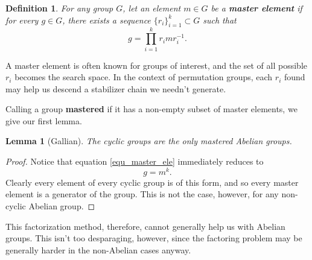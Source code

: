 \documentclass[12pt]{article}
\newtheorem{definition}{Definition}[section]
\newtheorem{lemma}{Lemma}[section]
\begin{document}
\begin{definition}
For any group $G$, let an element $m\in G$ be a \textbf{master element} if for
every $g\in G$, there exists a sequence $\{r_i\}_{i=1}^k\subset G$ such that
\begin{equation}\label{equ_master_ele}
g = \prod_{i=1}^k r_imr_i^{-1}.
\end{equation}
\end{definition}

A master element is often known for groups of interest, and the set of all
possible $r_i$ becomes the search space.  In the context of permutation groups,
each $r_i$ found may help us descend a stabilizer chain we needn't generate.

Calling a group \textbf{mastered} if it has a non-empty subset of master elements,
we give our first lemma.

\begin{lemma}[Gallian]
The cyclic groups are the only mastered Abelian groups.
\end{lemma}
\begin{proof}
Notice that equation \eqref{equ_master_ele} immediately reduces to
\begin{equation*}
g = m^k.
\end{equation*}
Clearly every element of every cyclic group is of this
form, and so every master element is a generator of the group.
This is not the case, however, for any non-cyclic Abelian group.
\end{proof}

This factorization method, therefore, cannot generally help us with Abelian groups.
This isn't too desparaging, however, since the factoring problem may be generally
harder in the non-Abelian cases anyway.

\end{document}
